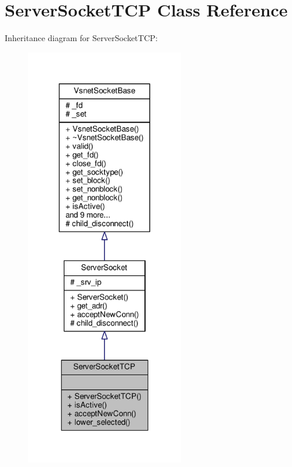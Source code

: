 \hypertarget{classServerSocketTCP}{}\section{Server\+Socket\+T\+CP Class Reference}
\label{classServerSocketTCP}


Inheritance diagram for Server\+Socket\+T\+CP\+:
\nopagebreak
\begin{figure}[H]
\begin{center}
\leavevmode
\includegraphics[width=196pt]{d4/d22/classServerSocketTCP__inherit__graph}
\end{center}
\end{figure}


